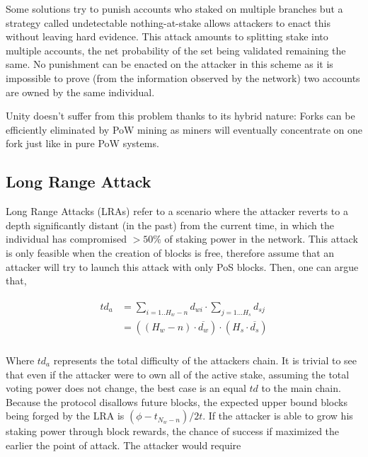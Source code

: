 \documentclass[a4paper]{article}
\begin{document}
Some solutions try to punish accounts who staked on multiple branches but a strategy called undetectable nothing-at-stake\cite{brown2018formal} allows attackers to enact this without leaving hard evidence. This attack amounts to splitting stake into multiple accounts, the net probability of the set being validated remaining the same. No punishment can be enacted on the attacker in this scheme as it is impossible to prove (from the information observed by the network) two accounts are owned by the same individual.

Unity doesn't suffer from this problem thanks to its hybrid nature: Forks can be efficiently eliminated by PoW mining as miners will eventually concentrate on one fork just like in pure PoW systems.


\subsection{Long Range Attack}
\label{sec:lra}

Long Range Attacks (LRAs) refer to a scenario where the attacker reverts to a depth significantly distant (in the past) from the current time, in which the individual has compromised $>50\%$ of staking power in the network. This attack is only feasible when the creation of blocks is free, therefore assume that an attacker will try to launch this attack with only PoS blocks. Then, one can argue that,

\begin{equation}
\begin{split}
\begin{aligned}
td_{a} &= \sum_{i = 1..H_w - n}{d_{wi}} \cdot \sum_{j = 1...H_s}{d_{sj}} \\
&= ((H_w - n) \cdot \overline{d_{w}}) \cdot (H_s \cdot \overline{d_{s}}) \\
\end{aligned}
\end{split}
\end{equation}

Where $td_{a}$ represents the total difficulty of the attackers chain. It is trivial to see that even if the attacker were to own all of the active stake, assuming the total voting power does not change, the best case is an equal $td$ to the main chain. Because the protocol disallows future blocks, the expected upper bound blocks being forged by the LRA is $(\phi - t_{N_w - n}) / 2t$. If the attacker is able to grow his staking power through block rewards, the chance of success if maximized the earlier the point of attack. The attacker would require 
\end{document}

